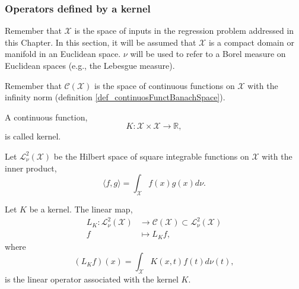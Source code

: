 \subsubsection{Operators defined by a kernel} \label{sec_operatorsKernel}

Remember that $\mathcal{X}$ is the space of inputs in the regression problem addressed in this Chapter. In this section, it will be assumed that $\mathcal{X}$ is a compact domain or manifold in an Euclidean space. $\nu$ will be used to refer to a Borel measure on Euclidean spaces (e.g., the Lebesgue measure).

Remember that $\mathcal{C}(\mathcal{X})$ is the space of continuous functions on $\mathcal{X}$ with the infinity norm (definition \ref{def_continuosFunctBanachSpace}).

\begin{definition}[Kernel] \label{def_kernel}
  A continuous function,
  \begin{equation*}
    K : \mathcal{X} \times \mathcal{X} \to \mathbb{R},
  \end{equation*}
  is called kernel.
\end{definition}

\begin{definition} \label{def_HilbertSpaceSquareIntegrableFunctions}
  Let $\mathcal{L}^2_{\nu}(\mathcal{X})$ be the Hilbert space of square integrable functions on $\mathcal{X}$ with the inner product,
  \begin{equation*}
    \langle f,g\rangle  = \int_{\mathcal{X}} f(x)g(x) d\nu.
  \end{equation*}
\end{definition}

\begin{definition} \label{def_linearOperator}
  Let $K$ be a kernel. The linear map,
  \begin{equation*}
    \begin{aligned}
      L_{K} : \mathcal{L}^2_{\nu}(\mathcal{X}) &\to \mathcal{C}(\mathcal{X}) \subset \mathcal{L}^2_{\nu}(\mathcal{X}) \\
      f &\mapsto L_{K}f,
    \end{aligned}
  \end{equation*}
  where 
  \begin{equation*}
    (L_{K}f)(x) = \int_{\mathcal{X}} K(x,t)f(t)d\nu(t), 
  \end{equation*}
  is the linear operator associated with the kernel $K$.
\end{definition}


